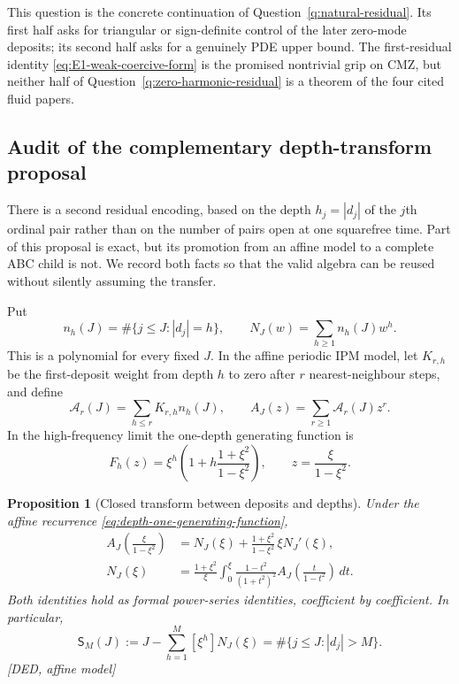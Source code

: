 \documentclass[11pt]{amsart}
\numberwithin{equation}{section}
\theoremstyle{plain}
\newtheorem{proposition}[theorem]{Proposition}
\theoremstyle{definition}
\theoremstyle{remark}
\begin{document}
This question is the concrete continuation of
Question~\ref{q:natural-residual}.  Its first half asks for triangular or
sign-definite control of the later zero-mode deposits; its second half asks
for a genuinely PDE upper bound.  The first-residual identity
\eqref{eq:E1-weak-coercive-form} is the promised nontrivial grip on CMZ, but
neither half of Question~\ref{q:zero-harmonic-residual} is a theorem of the
four cited fluid papers.

\subsection{Audit of the complementary depth-transform proposal}
\label{subsec:depth-transform-audit}

There is a second residual encoding, based on the depth
$h_j=|d_j|$ of the $j$th ordinal pair rather than on the number of pairs open
at one squarefree time.  Part of this proposal is exact, but its promotion
from an affine model to a complete ABC child is not.  We record both facts so
that the valid algebra can be reused without silently assuming the transfer.

Put
\begin{equation}
 n_h(J)=\#\{j\le J:|d_j|=h\},\qquad
 N_J(w)=\sum_{h\ge1}n_h(J)w^h.
\label{eq:depth-polynomial}
\end{equation}
This is a polynomial for every fixed $J$.  In the affine periodic IPM model,
let $K_{r,h}$ be the first-deposit weight from depth $h$ to zero after $r$
nearest-neighbour steps, and define
\begin{equation}
 \mathcal A_r(J)=\sum_{h\le r}K_{r,h}n_h(J),\qquad
 A_J(z)=\sum_{r\ge1}\mathcal A_r(J)z^r.
\label{eq:deposit-generating-functions}
\end{equation}
In the high-frequency limit the one-depth generating function is
\begin{equation}
 F_h(z)=\xi^h\left(1+h\frac{1+\xi^2}{1-\xi^2}\right),
 \qquad z=\frac{\xi}{1-\xi^2}.
\label{eq:depth-one-generating-function}
\end{equation}

\begin{proposition}[Closed transform between deposits and depths]
\label{prop:closed-depth-transform}
Under the affine recurrence \eqref{eq:depth-one-generating-function},
\begin{align}
 A_J\!\left(\frac{\xi}{1-\xi^2}\right)
 &=N_J(\xi)+\frac{1+\xi^2}{1-\xi^2}\,\xi N_J'(\xi),
\label{eq:depth-forward-transform}\\
 N_J(\xi)
 &=\frac{1+\xi^2}{\xi}\int_0^\xi
 \frac{1-t^2}{(1+t^2)^2}
 A_J\!\left(\frac{t}{1-t^2}\right)\,dt.
\label{eq:depth-inverse-transform}
\end{align}
Both identities hold as formal power-series identities, coefficient by
coefficient.  In particular,
\begin{equation}
 \mathsf S_M(J):=J-\sum_{h=1}^M[\xi^h]N_J(\xi)
 =\#\{j\le J:|d_j|>M\}.
\label{eq:depth-survivors}
\end{equation}
\textup{[DED, affine model]}
\end{proposition}
\end{document}
